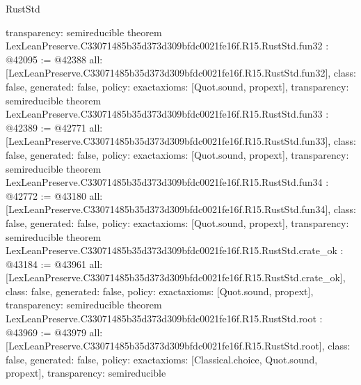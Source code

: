 \begin{lexlean}{RustStd}
\begin{coremodule}
{  transparency: semireducible
}
theorem LexLeanPreserve.C33071485b35d373d309bfdc0021fe16f.R15.RustStd.fun32 : @42095 := @42388 {
  all: [LexLeanPreserve.C33071485b35d373d309bfdc0021fe16f.R15.RustStd.fun32],
  class: false,
  generated: false,
  policy: exact{axioms: [Quot.sound, propext]},
  transparency: semireducible
}
theorem LexLeanPreserve.C33071485b35d373d309bfdc0021fe16f.R15.RustStd.fun33 : @42389 := @42771 {
  all: [LexLeanPreserve.C33071485b35d373d309bfdc0021fe16f.R15.RustStd.fun33],
  class: false,
  generated: false,
  policy: exact{axioms: [Quot.sound, propext]},
  transparency: semireducible
}
theorem LexLeanPreserve.C33071485b35d373d309bfdc0021fe16f.R15.RustStd.fun34 : @42772 := @43180 {
  all: [LexLeanPreserve.C33071485b35d373d309bfdc0021fe16f.R15.RustStd.fun34],
  class: false,
  generated: false,
  policy: exact{axioms: [Quot.sound, propext]},
  transparency: semireducible
}
theorem LexLeanPreserve.C33071485b35d373d309bfdc0021fe16f.R15.RustStd.crate_ok : @43184 := @43961 {
  all: [LexLeanPreserve.C33071485b35d373d309bfdc0021fe16f.R15.RustStd.crate_ok],
  class: false,
  generated: false,
  policy: exact{axioms: [Quot.sound, propext]},
  transparency: semireducible
}
theorem LexLeanPreserve.C33071485b35d373d309bfdc0021fe16f.R15.RustStd.root : @43969 := @43979 {
  all: [LexLeanPreserve.C33071485b35d373d309bfdc0021fe16f.R15.RustStd.root],
  class: false,
  generated: false,
  policy: exact{axioms: [Classical.choice, Quot.sound, propext]},
  transparency: semireducible
}


\end{coremodule}
\end{lexlean}
